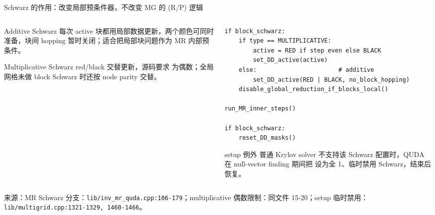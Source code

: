 \documentclass[UTF8,aspectratio=169,11pt]{ctexbeamer}
\newcommand{\source}[1]{\vspace{0.05em}\par{\raggedright\scriptsize\color{muted}来源：#1\par}}
\newcommand{\codepath}[1]{\nolinkurl{#1}}
\begin{document}
\begin{frame}[fragile,t]{Schwarz 的作用：改变局部预条件器，不改变 MG 的 (R/P) 逻辑}
  \begin{columns}[T,totalwidth=\textwidth]
    \begin{column}{0.47\textwidth}
      \begin{block}{Additive Schwarz}
        每次 active 块都用局部数据更新，两个颜色可同时准备，块间 hopping 暂时关闭；适合把局部块问题作为 MR 内部预条件。
      \end{block}
      \begin{block}{Multiplicative Schwarz}
        red/black 交替更新，源码要求 \texttt{} 为偶数；全局网格未做 block Schwarz 时还按 node parity 交替。
      \end{block}
    \end{column}
    \begin{column}{0.49\textwidth}
      \begin{lstlisting}[firstnumber=1]
if block_schwarz:
    if type == MULTIPLICATIVE:
        active = RED if step even else BLACK
        set_DD_active(active)
    else:                       # additive
        set_DD_active(RED | BLACK, no_block_hopping)
    disable_global_reduction_if_blocks_local()

run_MR_inner_steps()

if block_schwarz:
    reset_DD_masks()
      \end{lstlisting}
      \begin{alertblock}{setup 例外}
        普通 Krylov solver 不支持该 Schwarz 配置时，QUDA 在 null-vector finding 期间把 \texttt{} 设为全 1、临时禁用 Schwarz，结束后恢复。
      \end{alertblock}
    \end{column}
  \end{columns}
  \source{MR Schwarz 分支：\codepath{lib/inv_mr_quda.cpp:106-179}；multiplicative 偶数限制：同文件 15-20；setup 临时禁用：\codepath{lib/multigrid.cpp:1321-1329, 1460-1466}。}
\end{frame}
\end{document}
